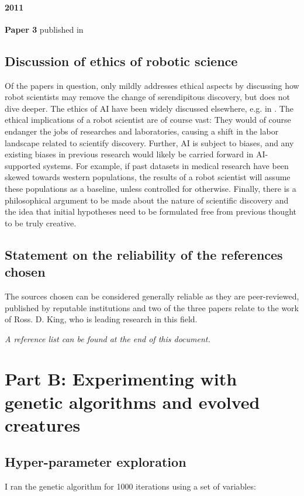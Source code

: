 \paragraph{2011} \textbf{Paper 3} published in \cite{sparkes_towards_2010}

\subsection{Discussion of ethics of robotic science}

Of the papers in question, only \cite{sparkes_towards_2010} mildly addresses ethical aspects by discussing how robot scientists may remove the change of serendipitous discovery, but does not dive deeper. The ethics of AI have been widely discussed elsewhere, e.g. in \cite{siau2020artificial}. The ethical implications of a robot scientist are of course vast: They would of course endanger the jobs of researches and laboratories, causing a shift in the labor landscape related to scientify discovery. Further, AI is subject to biases, and any existing biases in previous research would likely be carried forward in AI-supported systems. For example, if past datasets in medical research have been skewed towards western populations, the results of a robot scientist will assume these populations as a baseline, unless controlled for otherwise. Finally, there is a philosophical argument to be made about the nature of scientific discovery and the idea that initial hypotheses need to be formulated free from previous thought to be truly creative.

\subsection{Statement on the reliability of the references chosen}
The sources chosen can be considered generally reliable as they are peer-reviewed, published by reputable institutions and two of the three papers relate to the work of Ross. D. King, who is leading research in this field.

\textit{A reference list can be found at the end of this document.}

\section{Part B: Experimenting with genetic algorithms and evolved
creatures}

\subsection{Hyper-parameter exploration}
I ran the genetic algorithm for 1000 iterations using a set of variables:

